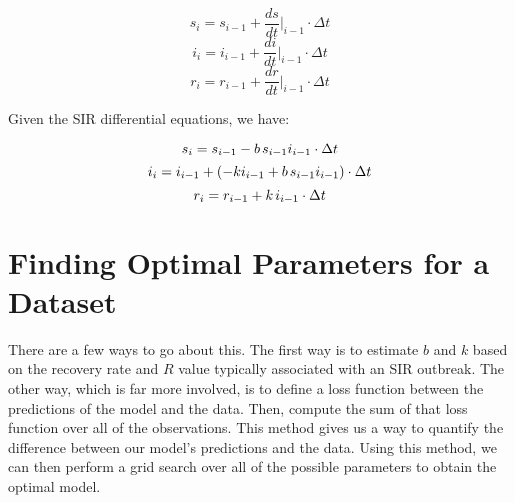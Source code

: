 \documentclass{article}
\begin{document}
\[s_i = s_{i-1} + \frac{ds}{dt}\Bigr|_{i-1} \cdot \Delta t\]
\[i_i = i_{i-1} + \frac{di}{dt}\Bigr|_{i-1}  \cdot \Delta t\]
\[r_i = r_{i-1} + \frac{dr}{dt}\Bigr|_{i-1}  \cdot \Delta t\]

\noindent
Given the SIR differential equations, we have:

\[s_i = s_{i-1} - b \hspace{0.5mm} s_{i-1} i_{i-1} \cdot \Delta t\]
\[i_i = i_{i-1} + (- k i_{i-1} + b \hspace{0.5mm} s_{i-1} i_{i-1}) \cdot \Delta t\]
\[r_i = r_{i-1} + k \hspace{0.5mm} i_{i-1} \cdot \Delta t\]

\section{Finding Optimal Parameters for a Dataset}
There are a few ways to go about this. The first way is to estimate $b$ and $k$ based on the recovery rate and $R$ value typically associated with an SIR outbreak. The other way, which is far more involved, is to define a loss function between the predictions of the model and the data. Then, compute the sum of that loss function over all of the observations. This method gives us a way to quantify the difference between our model's predictions and the data. Using this method, we can then perform a grid search over all of the possible parameters to obtain the optimal model. 
\end{document}
